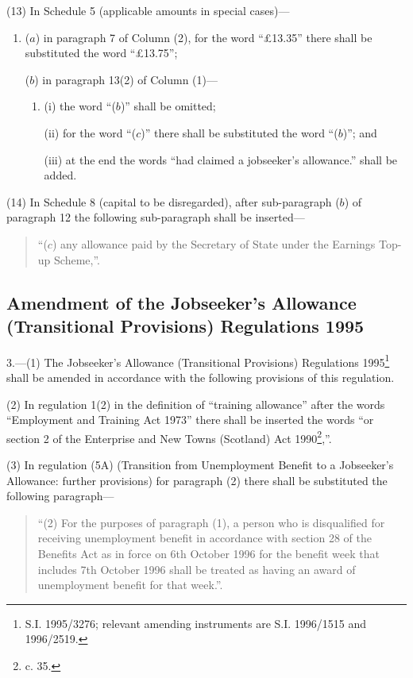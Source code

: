 \documentclass[a4paper]{article}
\begin{document}
(13) In Schedule 5 (applicable amounts in special cases)—
\begin{enumerate}\item[]
($a$) in paragraph 7 of Column (2), for the word “£13.35” there shall be substituted the word “£13.75”;

($b$) in paragraph 13(2) of Column (1)—
\begin{enumerate}\item[]
(i) the word “($b$)” shall be omitted;

(ii) for the word “($c$)” there shall be substituted the word “($b$)”; and

(iii) at the end the words “had claimed a jobseeker’s allowance.” shall be added.
\end{enumerate}
\end{enumerate}

(14) In Schedule 8 (capital to be disregarded), after sub-paragraph ($b$) of paragraph 12 the following sub-paragraph shall be inserted—
\begin{quotation}
“($c$) any allowance paid by the Secretary of State under the Earnings Top-up Scheme,”.
\end{quotation}

\subsection[3. Amendment of the Jobseeker’s Allowance (Transitional Provisions) Regulations 1995]{Amendment of the Jobseeker’s Allowance (Transitional Provisions) Regulations 1995}

3.—(1) The Jobseeker’s Allowance (Transitional Provisions) Regulations 1995\footnote{\frenchspacing S.I. 1995/3276; relevant amending instruments are S.I. 1996/1515 and 1996/2519.} shall be amended in accordance with the following provisions of this regulation.

(2) In regulation 1(2) in the definition of “training allowance” after the words “Employment and Training Act 1973” there shall be inserted the words “or section 2 of the Enterprise and New Towns (Scotland) Act 1990\footnote{ c. 35.},”.

(3) In regulation (5A) (Transition from Unemployment Benefit to a Jobseeker’s Allowance: further provisions) for paragraph (2) there shall be substituted the following paragraph—
\begin{quotation}
“(2) For the purposes of paragraph (1), a person who is disqualified for receiving unemployment benefit in accordance with section 28 of the Benefits Act as in force on 6th October 1996 for the benefit week that includes 7th October 1996 shall be treated as having an award of unemployment benefit for that week.”.
\end{quotation}
\end{document}
